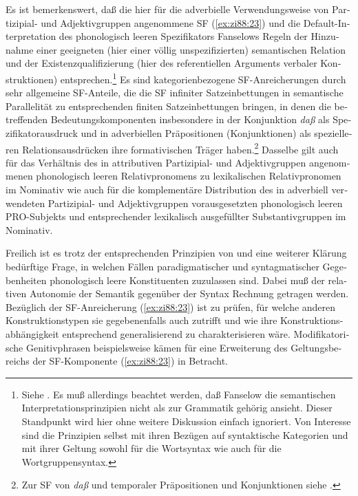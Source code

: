 \documentclass[output=paper,colorlinks,citecolor=brown, booklanguage=german]{langscibook}
\begin{document}
\begin{otherlanguage}{german}
Es ist bemerkenswert, daß die hier für die adverbielle Verwendungsweise von Partizipial- und Adjektivgruppen angenommene SF (\ref{ex:zi88:23}) und die Default-In\-ter\-pre\-ta\-tion des phonologisch leeren Spezifikators Fanselows Regeln der Hinzunahme einer geeigneten (hier einer völlig unspezifizierten) se\-man\-ti\-schen Relation und der Existenzqualifizierung (hier des referentiellen Arguments verbaler Konstruktionen) entsprechen.\footnote{Siehe \citet{Fanselow1985,Fanselow1986b,Fanselow1986a,Fanselow1988}. Es muß allerdings beachtet werden, daß Fanselow die semantischen Interpretationsprinzipien nicht als zur Grammatik gehörig ansieht. Dieser Standpunkt wird hier ohne weitere Diskussion einfach ignoriert. Von Interesse sind die Prinzipien selbst mit ihren Bezügen auf syntaktische Kategorien und mit ihrer Geltung sowohl für die Wortsyntax wie auch für die Wortgruppensyntax.} Es sind kategorienbezogene SF-Anreicherungen durch sehr allgemeine SF-Anteile, die die SF infiniter Satzeinbettungen in semantische Parallelität zu entsprechenden finiten Satzeinbettungen bringen, in denen die betreffenden Bedeutungskomponenten insbesondere in der Konjunktion \textit{daß} als Spezifikatorausdruck und in adverbiellen Präpositionen (Konjunktionen) als spezielleren Relationsausdrücken ihre for\-ma\-ti\-vi\-schen Träger haben.\footnote{Zur SF von \textit{daß} und temporaler Präpositionen und Konjunktionen siehe \citet{Steube1987-druck,Steube1987}.} Dasselbe gilt auch für das Verhältnis des in attributiven Partizipial- und Adjektivgruppen angenommenen phonologisch leeren Relativpronomens zu lexikalischen Relativpronomen im Nominativ wie auch für die komplementäre Distribution des in adverbiell verwendeten Partizipial- und Adjektivgruppen vorausgesetzten phonologisch leeren PRO-Subjekts und entsprechender lexikalisch ausgefüllter Substantivgruppen im Nominativ.

Freilich ist es trotz der entsprechenden Prinzipien von \citet{Chomsky1981,Chomsky1982,Chomsky1986} und \citet{Emonds1985,Emonds1987} eine weiterer Klärung bedürftige Frage, in welchen Fällen paradigmatischer und syntagmatischer Gegebenheiten pho\-no\-lo\-gisch leere Konstituenten zuzulassen sind. Dabei muß der relativen Autonomie der Semantik gegenüber der Syntax Rechnung getragen werden. Bezüglich der SF-Anreicherung (\ref{ex:zi88:23}) ist zu prüfen, für welche anderen Kon\-struk\-tions\-ty\-pen sie gegebenenfalls auch zutrifft und wie ihre Konstruktionsabhängigkeit entsprechend generalisierend zu charakterisieren wäre. Modifikatorische Genitivphrasen beispielsweise kämen für eine Erweiterung des Geltungsbereichs der SF-Kom\-po\-nen\-te (\ref{ex:zi88:23}) in Betracht.


\end{otherlanguage}
\end{document}
